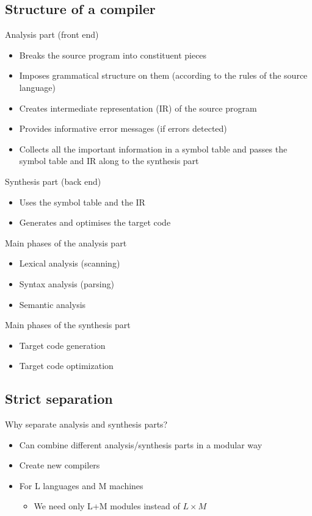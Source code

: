 \documentclass{article}[18pt]
\begin{document}
\subsection{Structure of a compiler}
Analysis part (front end)
\begin{itemize}
	\item Breaks the source program into constituent pieces
	\item Imposes grammatical structure on them (according to the rules of the source language)
	\item Creates intermediate representation (IR) of the source program
	\item Provides informative error messages (if errors detected)
	\item Collects all the important information in a symbol table and passes the symbol table and IR along to the synthesis part
\end{itemize}
Synthesis part (back end)
\begin{itemize}
	\item Uses the symbol table and the IR
	\item Generates and optimises the target code
\end{itemize}
Main phases of the analysis part
\begin{itemize}
	\item Lexical analysis (scanning)
	\item Syntax analysis (parsing)
	\item Semantic analysis
\end{itemize}
Main phases of the synthesis part
\begin{itemize}
	\item Target code generation
	\item Target code optimization
\end{itemize}
\subsection{Strict separation}
Why separate analysis and synthesis parts?
\begin{itemize}
	\item Can combine different analysis/synthesis parts in a modular way
	\item Create new compilers
	\item For L languages and M machines
	\begin{itemize}
		\item We need only L+M modules instead of $L\times M$
	\end{itemize}
\end{itemize}
\end{document}
